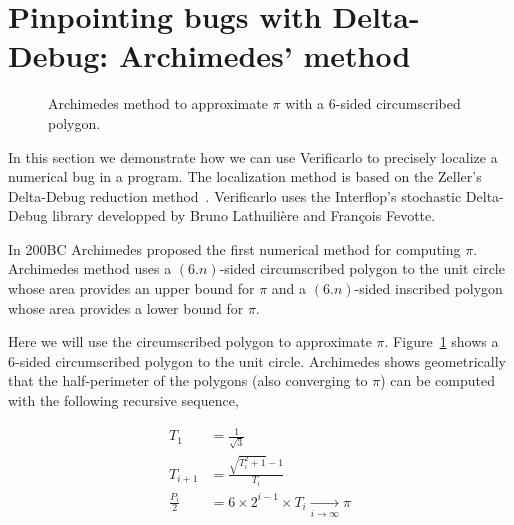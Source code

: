 \section{Pinpointing bugs with Delta-Debug: Archimedes' method}

\begin{figure}[h]
  \centering
  \caption{Archimedes method to approximate $\pi$ with a 6-sided circumscribed polygon.
    \label{fig:archimedes}
  }
\end{figure}

In this section we demonstrate how we can use Verificarlo to precisely localize a numerical bug in a program. The localization method is based on the Zeller's Delta-Debug reduction method~\cite{zeller2001automated}. Verificarlo uses the Interflop's stochastic Delta-Debug library developped by Bruno Lathuilière and François Fevotte.

In 200BC Archimedes proposed the first numerical method for computing $\pi$.
Archimedes method uses a $(6.n)$-sided circumscribed polygon to the unit circle
whose area provides an upper bound for $\pi$ and a $(6.n)$-sided inscribed polygon
whose area provides a lower bound for $\pi$.

Here we will use the circumscribed polygon to approximate $\pi$.
Figure~\ref{fig:archimedes} shows a 6-sided circumscribed polygon to the unit
circle. Archimedes shows geometrically that the half-perimeter of the polygons (also converging to $\pi$) can be computed with the following recursive sequence,

\begin{align*}
  T_1 &= \frac{1}{\sqrt{3}} \\
  T_{i+1} &= \frac{\sqrt{T_i^2+1} - 1}{T_i} \\
  \frac{P_{i}}{2} &= 6 \times 2^{i-1} \times T_{i} \xrightarrow[i \to \infty]{} \pi
\end{align*}

